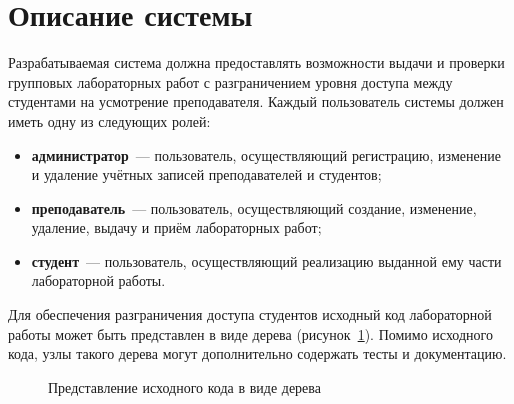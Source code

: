 \documentclass{bmstu}
\begin{document}
  \section{Описание системы} \label{chapter:system-description}

  Разрабатываемая система должна предоставлять возможности выдачи и
  проверки групповых лабораторных работ с разграничением уровня
  доступа между студентами на усмотрение преподавателя.
  Каждый пользователь системы должен иметь одну из следующих ролей:
  \begin{itemize}[label=---]
    \item \textbf{администратор}~--- пользователь, осуществляющий
      регистрацию, изменение и удаление учётных записей преподавателей
      и студентов;
    \item \textbf{преподаватель}~--- пользователь, осуществляющий
      создание, изменение, удаление, выдачу и приём лабораторных
      работ;
    \item \textbf{студент}~--- пользователь, осуществляющий реализацию
      выданной ему части лабораторной работы.
  \end{itemize}

  Для обеспечения разграничения доступа студентов исходный код
  лабораторной работы может быть представлен в виде дерева
  (рисунок~\ref{fig:source-code-tree}).
  Помимо исходного кода, узлы такого дерева могут дополнительно
  содержать тесты и документацию.

  \begin{figure}[ht]
    \centering


    \caption{Представление исходного кода в виде дерева}
    \label{fig:source-code-tree}
  \end{figure}
\end{document}
